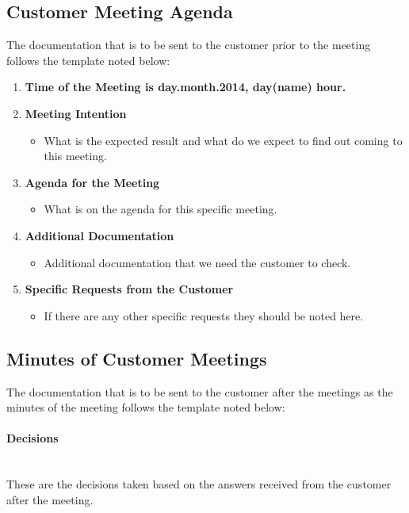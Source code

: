 \documentclass[../document]{subfiles}
\begin{document}
\subsection{Customer Meeting Agenda}
The documentation that is to be sent to the customer prior to the meeting follows the template noted below:

\begin{enumerate}
	\item
	\textbf{Time of the Meeting is day.month.2014, day(name) hour.}
	\item
	\textbf{Meeting Intention}
	\begin{itemize}
		\item
		What is the expected result and what do we expect to find out coming to this meeting.
	\end{itemize}
	\item
	\textbf{Agenda for the Meeting}
	\begin{itemize}
		\item
		What is on the agenda for this specific meeting.
	\end{itemize}
	\item
	\textbf{Additional Documentation}
	\begin{itemize}
		\item
		Additional documentation that we need the customer to check.
	\end{itemize}
	\item
	\textbf{Specific Requests from the Customer}
	\begin{itemize}
		\item
		If there are any other specific requests they should be noted here.
	\end{itemize}
\end{enumerate}

\newpage
\subsection{Minutes of Customer Meetings}
The documentation that is to be sent to the customer after the meetings as the minutes of the meeting follows the template noted below:

\paragraph{Decisions} \ \\
These are the decisions taken based on the answers received from the customer after the meeting.
\end{document}
